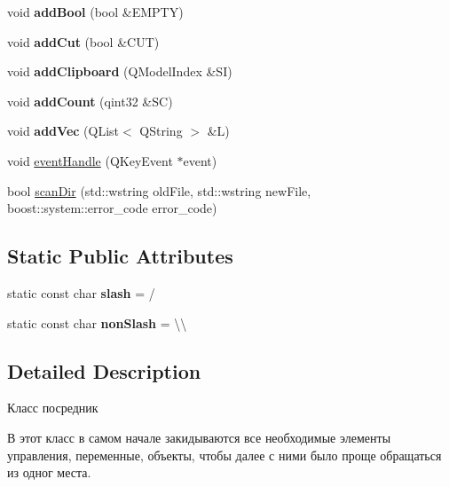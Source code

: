 \begin{DoxyCompactItemize}
void {\bfseries add\+Bool} (bool \&E\+M\+P\+TY)
\item 
\mbox{\label{class_custom_tree_ae72ee91343f0b84f04289ff640350f07}} 
void {\bfseries add\+Cut} (bool \&C\+UT)
\item 
\mbox{\label{class_custom_tree_a588b7b357c6efd6479fe2dddcb55adbb}} 
void {\bfseries add\+Clipboard} (Q\+Model\+Index \&SI)
\item 
\mbox{\label{class_custom_tree_afe4e3fa1b690292c90273b0d3452c70f}} 
void {\bfseries add\+Count} (qint32 \&SC)
\item 
\mbox{\label{class_custom_tree_ad885c6ead133dc48af4ec300f5a38e23}} 
void {\bfseries add\+Vec} (Q\+List$<$ Q\+String $>$ \&L)
\item 
void \hyperlink{class_custom_tree_a3687c6feff0539eec56582ff95239589}{event\+Handle} (Q\+Key\+Event $\ast$event)
\item 
bool \hyperlink{class_custom_tree_a373ba76bdc9886cd2e997d5af84a0cba}{scan\+Dir} (std\+::wstring old\+File, std\+::wstring new\+File, boost\+::system\+::error\+\_\+code error\+\_\+code)
\end{DoxyCompactItemize}
\subsection*{Static Public Attributes}
\begin{DoxyCompactItemize}
\item 
\mbox{\label{class_custom_tree_a0db9d3bfff8ac0d3a0509959210621b2}} 
static const char {\bfseries slash} = \textquotesingle{}/\textquotesingle{}
\item 
\mbox{\label{class_custom_tree_a29b0f6e5a661df1478b820c96baabe09}} 
static const char {\bfseries non\+Slash} = \textquotesingle{}\textbackslash{}\textbackslash{}\textquotesingle{}
\end{DoxyCompactItemize}


\subsection{Detailed Description}
Класс посредник 

В этот класс в самом начале закидываются все необходимые элементы управления, переменные, объекты, чтобы далее с ними было проще обращаться из одног места. 

